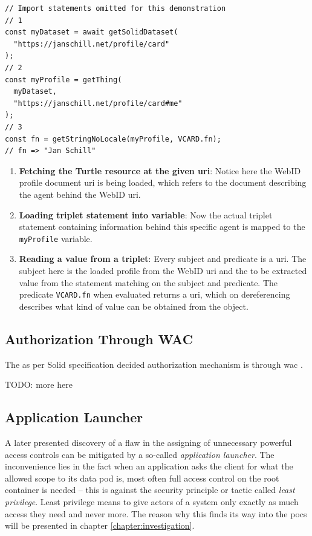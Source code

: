 \begin{lstlisting}[language=Other,columns=fullflexible, caption={Basic usage of Inrupt's solid-client library.}, label={lst:2}]
// Import statements omitted for this demonstration
// 1
const myDataset = await getSolidDataset(
  "https://janschill.net/profile/card"
);
// 2
const myProfile = getThing(
  myDataset,
  "https://janschill.net/profile/card#me"
);
// 3
const fn = getStringNoLocale(myProfile, VCARD.fn);
// fn => "Jan Schill"
\end{lstlisting}

\begin{enumerate}
    \item \textbf{Fetching the Turtle resource at the given \gls{uri}}: Notice here the WebID profile document \gls{uri} is being loaded, which refers to the document describing the agent behind the WebID \gls{uri}.
    \item \textbf{Loading triplet statement into variable}: Now the actual triplet statement containing information behind this specific agent is mapped to the \texttt{myProfile} variable.
    \item \textbf{Reading a value from a triplet}: Every subject and predicate is a \gls{uri}. The subject here is the loaded profile from the WebID \gls{uri} and the to be extracted value from the statement matching on the subject and predicate. The predicate \texttt{VCARD.fn} when evaluated returns a \gls{uri}, which on dereferencing describes what kind of value can be obtained from the object.
\end{enumerate}

\subsection{Authorization Through WAC}

The as per Solid specification decided authorization mechanism is through \gls{wac} \cite{wac}.

TODO: more here

\subsection{Application Launcher}

A later presented discovery of a flaw in the assigning of unnecessary powerful access controls can be mitigated by a so-called \textit{application launcher}. The inconvenience lies in the fact when an application asks the client for what the allowed scope to its data pod is, most often full access control on the root container is needed -- this is against the security principle or tactic called \textit{least privilege}. Least privilege means to give actors of a system only exactly as much access they need and never more. The reason why this finds its way into the \glspl{poc} will be presented in chapter \ref{chapter:investigation}.

